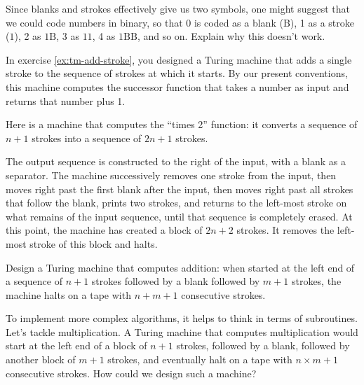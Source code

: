 \begin{exercise}
  Since blanks and strokes effectively give us two symbols,
  one might suggest that we could code numbers in binary,
  so that 0 is coded as a blank ($\mathrm{B}$),
  1 as a stroke ($1$),
  2 as $1\mathrm{B}$,
  3 as $11$,
  4 as $1\mathrm{B}\mathrm{B}$,
  and so on.
  Explain why this doesn't work.
\end{exercise}

In exercise \ref{ex:tm-add-stroke},
you designed a Turing machine that adds a single stroke to
the sequence of strokes at which it starts.
By our present conventions,
this machine computes the successor function
that takes a number as input and returns that number plus 1.

Here is a machine that computes the ``times 2'' function:
it converts a sequence of $n+1$ strokes into a sequence of $2n+1$ strokes.

\begin{center}
  
\end{center}

The output sequence is constructed to the right of the input,
with a blank as a separator.
The machine successively removes one stroke from the input,
then moves right past the first blank after the input,
then moves right past all strokes that follow the blank,
prints two strokes, and returns to the left-most stroke
on what remains of the input sequence,
until that sequence is completely erased.
At this point,
the machine has created a block of $2n+2$ strokes.
It removes the left-most stroke of this block and halts.

\begin{exercise}
  Design a Turing machine that computes addition:
  when started at the left end of a sequence of $n+1$ strokes
  followed by a blank followed by $m+1$ strokes,
  the machine halts on a tape with $n+m+1$ consecutive strokes.
\end{exercise}

To implement more complex algorithms,
it helps to think in terms of subroutines.
Let's tackle multiplication.
A Turing machine that computes multiplication
would start at the left end of a block of $n+1$ strokes,
followed by a blank, followed by another block of $m+1$ strokes,
and eventually halt on a tape with $n \times m + 1$ consecutive strokes.
How could we design such a machine?

